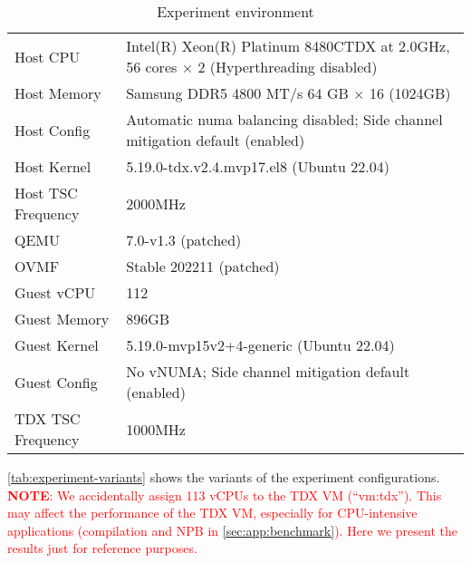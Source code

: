 \documentclass[letterpaper,twocolumn,10pt]{article}
\newcommand{\MP}[1]{\textcolor{red}{#1}}
\newcommand{\grumbler}[2]{\MP{{\bf #1}: #2}}
\newcommand{\note}[1]{\grumbler{NOTE}{#1}}
\begin{document}
\begin{table*}[t]
\centering
\caption{Experiment environment}
\label{tab:experiment-environment}
\begin{tabular}{l|l}
\toprule
    Host CPU      & Intel(R) Xeon(R) Platinum 8480CTDX at 2.0GHz, 56 cores $\times$ 2 (Hyperthreading disabled) \\
    Host Memory   & Samsung DDR5 4800 MT/s 64 GB $\times$ 16 (1024GB) \\
    Host Config   & Automatic numa balancing disabled; Side channel mitigation default (enabled) \\
    Host Kernel   & 5.19.0-tdx.v2.4.mvp17.el8 (Ubuntu 22.04) \\
    Host TSC Frequency & 2000MHz \\
    QEMU          & 7.0-v1.3 (patched) \\
\midrule
    OVMF          & Stable 202211 (patched) \\
    Guest vCPU    & 112 \\
    Guest Memory  & 896GB  \\
    Guest Kernel  & 5.19.0-mvp15v2+4-generic (Ubuntu 22.04) \\
    Guest Config  & No vNUMA; Side channel mitigation default (enabled) \\
    TDX TSC Frequency & 1000MHz \\
\bottomrule
\end{tabular}
\end{table*}

\autoref{tab:experiment-variants} shows the variants of the experiment configurations.
\note{
We accidentally assign 113 vCPUs to the TDX VM (``vm:tdx'').
This may affect the performance of the TDX VM, especially for CPU-intensive applications (compilation and NPB in \autoref{sec:app:benchmark}).
Here we present the results just for reference purposes.
}
\end{document}
